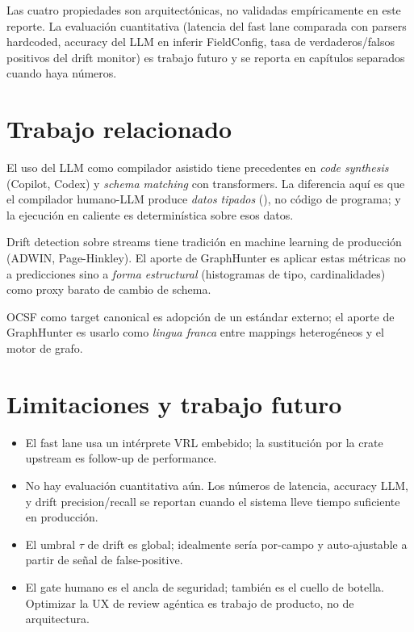 Las cuatro propiedades son arquitectónicas, no validadas
empíricamente en este reporte. La evaluación cuantitativa
(latencia del fast lane comparada con parsers hardcoded, accuracy
del LLM en inferir FieldConfig, tasa de verdaderos/falsos
positivos del drift monitor) es trabajo futuro y se reporta en
capítulos separados cuando haya números.

\section{Trabajo relacionado}

El uso del LLM como compilador asistido tiene precedentes en
\emph{code synthesis} (Copilot, Codex) y \emph{schema matching} con
transformers. La diferencia aquí es que el compilador humano-LLM
produce \emph{datos tipados} (), no código de
programa; y la ejecución en caliente es determinística sobre esos
datos.

Drift detection sobre streams tiene tradición en machine learning
de producción (ADWIN, Page-Hinkley). El aporte de GraphHunter es
aplicar estas métricas no a predicciones sino a \emph{forma
estructural} (histogramas de tipo, cardinalidades) como proxy
barato de cambio de schema.

OCSF como target canonical es adopción de un estándar externo; el
aporte de GraphHunter es usarlo como \emph{lingua franca} entre
mappings heterogéneos y el motor de grafo.

\section{Limitaciones y trabajo futuro}

\begin{itemize}
    \item El fast lane usa un intérprete VRL embebido; la sustitución
    por la crate  upstream es follow-up de performance.
    \item No hay evaluación cuantitativa aún. Los números de
    latencia, accuracy LLM, y drift precision/recall se reportan
    cuando el sistema lleve tiempo suficiente en producción.
    \item El umbral $\tau$ de drift es global; idealmente sería
    por-campo y auto-ajustable a partir de señal de false-positive.
    \item El gate humano es el ancla de seguridad; también es el
    cuello de botella. Optimizar la UX de review agéntica es
    trabajo de producto, no de arquitectura.
\end{itemize}
